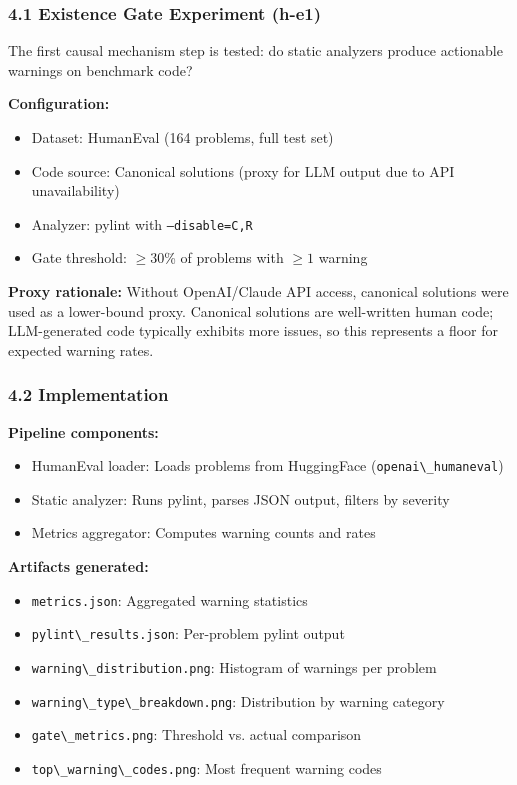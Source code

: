 
\subsubsection{4.1 Existence Gate Experiment (h-e1)}

The first causal mechanism step is tested: do static analyzers produce actionable warnings on benchmark code?

\textbf{Configuration:}
\begin{itemize}
\item Dataset: HumanEval (164 problems, full test set)
\item Code source: Canonical solutions (proxy for LLM output due to API unavailability)
\item Analyzer: pylint with \texttt{--disable=C,R}
\item Gate threshold: $\geq 30$\% of problems with $\geq 1$ warning
\end{itemize}

\textbf{Proxy rationale:} Without OpenAI/Claude API access, canonical solutions were used as a lower-bound proxy. Canonical solutions are well-written human code; LLM-generated code typically exhibits more issues, so this represents a floor for expected warning rates.

\subsubsection{4.2 Implementation}

\textbf{Pipeline components:}
\begin{itemize}
\item HumanEval loader: Loads problems from HuggingFace (\texttt{openai\textbackslash \_humaneval})
\item Static analyzer: Runs pylint, parses JSON output, filters by severity
\item Metrics aggregator: Computes warning counts and rates
\end{itemize}

\textbf{Artifacts generated:}
\begin{itemize}
\item \texttt{metrics.json}: Aggregated warning statistics
\item \texttt{pylint\textbackslash \_results.json}: Per-problem pylint output
\item \texttt{warning\textbackslash \_distribution.png}: Histogram of warnings per problem
\item \texttt{warning\textbackslash \_type\textbackslash \_breakdown.png}: Distribution by warning category
\item \texttt{gate\textbackslash \_metrics.png}: Threshold vs. actual comparison
\item \texttt{top\textbackslash \_warning\textbackslash \_codes.png}: Most frequent warning codes
\end{itemize}
